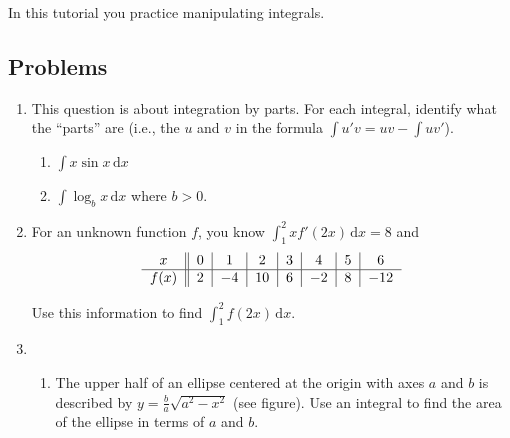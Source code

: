 	\begin{objectives}
        In this tutorial you practice manipulating integrals.
	\end{objectives}

		\vspace{-.5em}
		\subsection*{Problems}
		\vspace{-.5em}


\begin{enumerate}
    \item This question is about integration by parts. For each integral, identify what the ``parts'' are (i.e., the $u$ and $v$ in the formula
    $\displaystyle \int u'v = uv-\int uv'$).
    \begin{enumerate}
        \item $\displaystyle \int x\sin x\,\mathrm d x$
        \item $\displaystyle\int\log_b x\,\mathrm d x$ where $b>0$.
    \end{enumerate}
    \item 
    For an unknown function $f$, you know $\displaystyle\int_1^2 xf'(2x)\,\mathrm d x=8$ and 
    	\begin{align*}
    	    \hfill\begin{tabular}{c||c|c|c|c|c|c|c}
            $x$&$0$&$1$&$2$&$3$&$4$&$5$&$6$\\
            \hline
            $f(x)$&$2$&$-4$&$10$&$6$&$-2$&$8$&$-12$
            \end{tabular}\hfill\null
    	\end{align*}

        Use this information to find $\displaystyle\int_1^2 f(2x)\,\mathrm d x$.

    \item \phantom{x}
    \begin{enumerate}

        \item \phantom{x}
        
        \begin{minipage}{0.5\textwidth}
        The upper half of an ellipse centered at the origin with axes $a$ and $b$ is described by $y = \frac{b}{a}\sqrt{a^2-x^2}$ (see figure). Use an integral to find the area of the ellipse in terms of $a$ and $b$.


\end{minipage}
\end{enumerate}
\end{enumerate}
